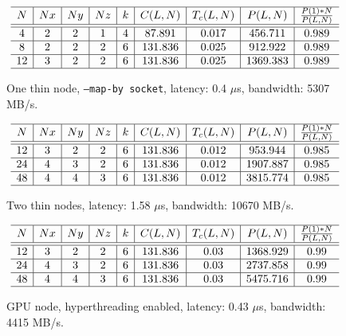 \documentclass{article}
\begin{document}
\begin{figure}
    $$
        \begin{array}{c | c | c | c | c | c | c | c | c} \hline
            N  & Nx & Ny & Nz & k & C(L,N)  & T_c(L,N) &     P(L,N)     & \frac{P(1)*N}{P(L,N)} \\ \hline
            \hline
            4  & 2  & 2  & 1  & 4 & 87.891  &  0.017   & 456.711  &         0.989         \\ \hline
            8  & 2  & 2  & 2  & 6 & 131.836 &  0.025   & 912.922  &         0.989         \\ \hline
            12 & 3  & 2  & 2  & 6 & 131.836 &  0.025   & 1369.383 &         0.989         \\ \hline
        \end{array}
    $$
    \caption{One thin node, \texttt{--map-by socket}, latency: 0.4 $\mu$s, bandwidth: 5307 MB/s.}
\end{figure}


\begin{figure}
    $$
        \begin{array}{c | c | c | c | c | c | c | c | c} \hline
            N  & Nx & Ny & Nz & k & C(L,N)  & T_c(L,N) &     P(L,N)     & \frac{P(1)*N}{P(L,N)} \\ \hline
            \hline
            12 & 3  & 2  & 2  & 6 & 131.836 &  0.012   & 953.944  &         0.985         \\ \hline
            24 & 4  & 3  & 2  & 6 & 131.836 &  0.012   & 1907.887 &         0.985         \\ \hline
            48 & 4  & 4  & 3  & 6 & 131.836 &  0.012   & 3815.774 &         0.985         \\ \hline
        \end{array}
    $$
    \caption{Two thin nodes, latency: 1.58 $\mu$s, bandwidth: 10670 MB/s.}
\end{figure}


\begin{figure}
    $$
        \begin{array}{c | c | c | c | c | c | c | c | c} \hline
            N  & Nx & Ny & Nz & k & C(L,N)  & T_c(L,N) &     P(L,N)     & \frac{P(1)*N}{P(L,N)} \\ \hline
            \hline
            12 & 3  & 2  & 2  & 6 & 131.836 &   0.03   & 1368.929 &         0.99          \\ \hline
            24 & 4  & 3  & 2  & 6 & 131.836 &   0.03   & 2737.858 &         0.99          \\ \hline
            48 & 4  & 4  & 3  & 6 & 131.836 &   0.03   & 5475.716 &         0.99          \\ \hline
        \end{array}
    $$
    \caption{GPU node, hyperthreading enabled, latency: 0.43 $\mu$s, bandwidth: 4415 MB/s.}
\end{figure}
\end{document}

